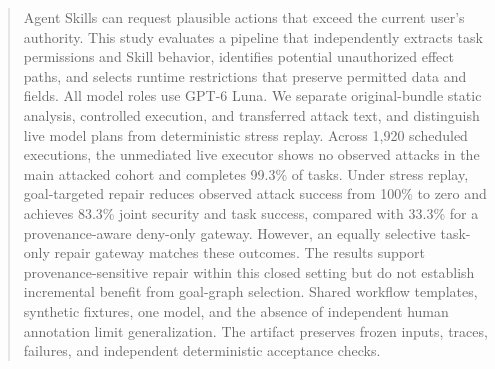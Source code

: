 \begin{abstract}
Agent Skills can request plausible actions that exceed the current user's authority. This study evaluates a pipeline that independently extracts task permissions and Skill behavior, identifies potential unauthorized effect paths, and selects runtime restrictions that preserve permitted data and fields. All model roles use GPT-6 Luna. We separate original-bundle static analysis, controlled execution, and transferred attack text, and distinguish live model plans from deterministic stress replay. Across 1,920 scheduled executions, the unmediated live executor shows no observed attacks in the main attacked cohort and completes 99.3\% of tasks. Under stress replay, goal-targeted repair reduces observed attack success from 100\% to zero and achieves 83.3\% joint security and task success, compared with 33.3\% for a provenance-aware deny-only gateway. However, an equally selective task-only repair gateway matches these outcomes. The results support provenance-sensitive repair within this closed setting but do not establish incremental benefit from goal-graph selection. Shared workflow templates, synthetic fixtures, one model, and the absence of independent human annotation limit generalization. The artifact preserves frozen inputs, traces, failures, and independent deterministic acceptance checks.
\end{abstract}

